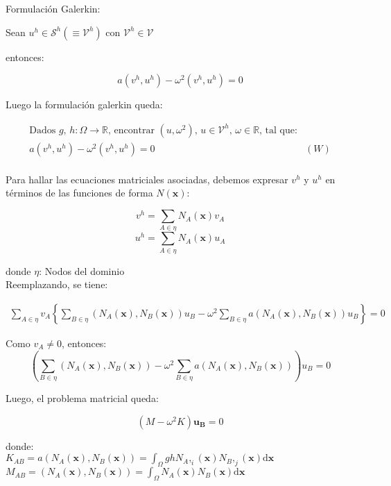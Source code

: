 Formulaci\'on Galerkin:

Sean $u^h \in \mathcal{S}^h \left( \equiv \mathcal{V}^h \right)$ con $\mathcal{V}^h \in \mathcal{V}$

entonces:

$$ a(v^h, u^h) - \omega^2 (v^h, u^h) = 0 $$

Luego la formulaci\'on galerkin queda:

\begin{align*}
\text{Dados $g$, $h: \Omega \rightarrow \mathbb{R}$, encontrar $(u, \omega^2)$, $u \in \mathcal{V}^h $, $\omega \in \mathbb{R}$, tal que:}\\
a(v^h, u^h) - \omega^2 (v^h, u^h) = 0 \ \ \ \ \  & (W) \\
\end{align*}

Para hallar las ecuaciones matriciales asociadas, debemos expresar $v^h$ y $u^h$ en t\'erminos de las funciones de forma $N(\boldsymbol{x})$:

$$v^h = \sum_{A \in \eta}N_A(\boldsymbol{x})v_A$$
$$u^h = \sum_{A \in \eta}N_A(\boldsymbol{x})u_A$$

donde 
$\eta$: Nodos del dominio\\

Reemplazando, se tiene:

\begin{equation*}
\begin{split}
\sum_{A \in \eta} v_A 
\left \{
\sum_{B \in \eta}(N_A(\boldsymbol{x}), N_B(\boldsymbol{x})) u_B - 
\omega^2 \sum_{B \in \eta} a(N_A(\boldsymbol{x}), N_B(\boldsymbol{x})) u_B 
\right \} = 0
\end{split}
\end{equation*}

Como $v_A \neq 0$, entonces:
$$\left( \sum_{B \in \eta}(N_A(\boldsymbol{x}), N_B(\boldsymbol{x})) - 
\omega^2 \sum_{B \in \eta} a(N_A(\boldsymbol{x}), N_B(\boldsymbol{x}))\right) u_B =0 $$

Luego, el problema matricial queda:

$$(M - \omega^2 K)\boldsymbol{u_B} = 0$$

donde:\\

$K_{AB} = a(N_A(\boldsymbol{x}), N_B(\boldsymbol{x})) = \int_{\Omega} gh N_A,_i(\boldsymbol{x}) N_B,_j(\boldsymbol{x}) \mathrm{d}\boldsymbol{x} $\\

$M_{AB} = (N_A(\boldsymbol{x}), N_B(\boldsymbol{x})) = \int_{\Omega} N_A(\boldsymbol{x}) N_B(\boldsymbol{x}) \mathrm{d}\boldsymbol{x} $\\

